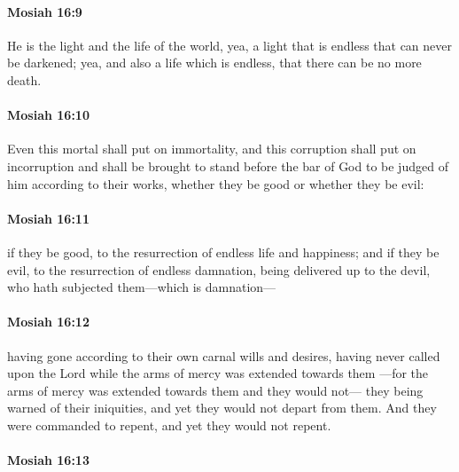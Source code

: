 		\paragraph{Mosiah 16:9} %
			\label{MOSIAH-16-9}

			He is the light and the life of the world,
			yea, a light that is endless that can never be darkened;
			yea, and also a life which is endless, that there can be no more death.

		\paragraph{Mosiah 16:10} %
			\label{MOSIAH-16-10}

			Even this mortal shall put on immortality,
			and this corruption shall put on incorruption
			and shall be brought to stand before the bar of God
			to be judged of him according to their works,
			whether they be good or whether they be evil:

		\paragraph{Mosiah 16:11} %
			\label{MOSIAH-16-11}

			if they be good, to the resurrection of endless life and happiness;
			and if they be evil, to the resurrection of endless damnation,
			being delivered up to the devil,
			who hath subjected them---which is damnation---

		\paragraph{Mosiah 16:12} %
			\label{MOSIAH-16-12}

			having gone according to their own carnal wills and desires,
			having never called upon the Lord
			while the arms of mercy was extended towards them
			---for the arms of mercy was extended towards them and they would not---
			they being warned of their iniquities,
			and yet they would not depart from them.
			And they were commanded to repent,
			and yet they would not repent.

		\paragraph{Mosiah 16:13} %
			\label{MOSIAH-16-13}

